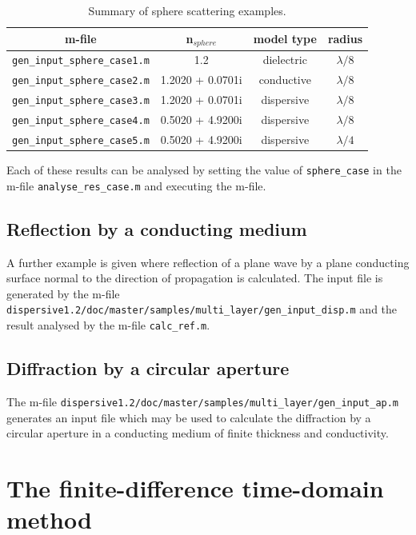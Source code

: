 \documentclass[a4paper, 12pt]{article}
\begin{document}
	\begin{table}[!h]
		\begin{center}
			\begin{tabular}{|c|c|c|c|}
				\hline
				m-file&n$_{sphere}$&model type&radius\\
				\hline
				\verb+gen_input_sphere_case1.m+&1.2&dielectric&$\lambda/8$\\
				\hline
				\verb+gen_input_sphere_case2.m+&1.2020 + 0.0701i&conductive&$\lambda/8$\\
				\hline
				\verb+gen_input_sphere_case3.m+&1.2020 + 0.0701i&dispersive&$\lambda/8$\\
				\hline
				\verb+gen_input_sphere_case4.m+&0.5020 + 4.9200i&dispersive&$\lambda/8$\\
				\hline
				\verb+gen_input_sphere_case5.m+&0.5020 + 4.9200i&dispersive&$\lambda/4$\\
				\hline
			\end{tabular}
		\end{center}
		\caption{Summary of sphere scattering examples.}
		\label{tab:examples}
	\end{table}
	
	Each of these results can be analysed by setting the value of
	\verb+sphere_case+ in the m-file \verb+analyse_res_case.m+ and
	executing the m-file.
	\subsection{Reflection by a conducting medium}
	A further example is given where reflection of a plane wave by a plane
	conducting surface normal to the direction of propagation is
	calculated. The input file is generated by the m-file
	\newline\verb+dispersive1.2/doc/master/samples/multi_layer/gen_input_disp.m+
	and the result analysed by the m-file \verb+calc_ref.m+.
	
	\subsection{Diffraction by a circular aperture}
	The m-file
	\newline\verb+dispersive1.2/doc/master/samples/multi_layer/gen_input_ap.m+
	generates an input file which may be used to calculate the diffraction
	by a circular aperture in a conducting medium of finite thickness and conductivity.
	
	
	\clearpage
	
	\appendix
	\section{The finite-difference time-domain method}
\end{document}
